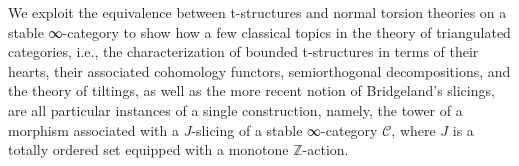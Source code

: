 \begin{eyenumerate}
   {}
   {We exploit the equivalence between t-structures and normal torsion theories on a stable ∞-category to show how a few classical topics in the theory of triangulated categories, i.e., the characterization of bounded t-structures in terms of their hearts, their associated cohomology functors, semiorthogonal decompositions, and the theory of tiltings, as well as the more recent notion of Bridgeland's slicings, are all particular instances of a single construction, namely, the tower of a morphism associated with a $J$-slicing of a stable ∞-category $\mathcal C$, where $J$ is a totally ordered set equipped with a monotone $\mathbb{Z}$-action.}
\end{eyenumerate}
